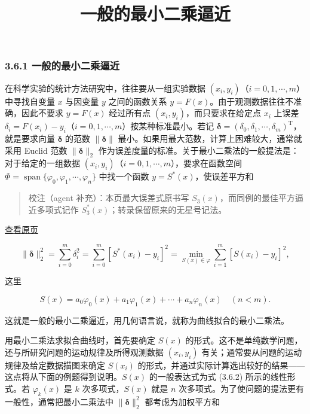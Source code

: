 \documentclass[
  10pt,
  fontset=fandol]{ctexart}
\title{一般的最小二乘逼近}
\author{}
\date{}
\begin{document}
\maketitle

\subsubsection{3.6.1 一般的最小二乘逼近}\label{ux4e00ux822cux7684ux6700ux5c0fux4e8cux4e58ux903cux8fd1}

在科学实验的统计方法研究中，往往要从一组实验数据 \((x_i,y_i)\)（\(i=0,1,\cdots,m\)）中寻找自变量 \(x\) 与因变量 \(y\) 之间的函数关系 \(y=F(x)\)。由于观测数据往往不准确，因此不要求 \(y=F(x)\) 经过所有点 \((x_i,y_i)\)，而只要求在给定点 \(x_i\) 上误差 \(\delta_i=F(x_i)-y_i\)（\(i=0,1,\cdots,m\)）按某种标准最小。若记 \(\boldsymbol\delta=(\delta_0,\delta_1,\cdots,\delta_m)^{\mathrm T}\)，就是要求向量 \(\boldsymbol\delta\) 的范数 \(\|\boldsymbol\delta\|\) 最小。如果用最大范数，计算上困难较大，通常就采用 Euclid 范数 \(\|\boldsymbol\delta\|_2\) 作为误差度量的标准。关于最小二乘法的一般提法是：对于给定的一组数据 \((x_i,y_i)\)（\(i=0,1,\cdots,m\)），要求在函数空间 \(\Phi=\operatorname{span}\{\varphi_0,\varphi_1,\cdots,\varphi_n\}\) 中找一个函数 \(y=S^*(x)\)，使误差平方和

\begin{quote}
校注（agent 补充）：本页最大误差式原书写 \(S_3(x)\)，而同例的最佳平方逼近多项式记作 \(S_3^*(x)\)；转录保留原来的无星号记法。
\end{quote}

\href{../../source-images/pdf-079.jpeg}{查看原页}

\[
\|\boldsymbol\delta\|_2^2=\sum_{i=0}^m\delta_i^2=\sum_{i=0}^m[S^*(x_i)-y_i]^2=\min_{S(x)\in\varphi}\sum_{i=1}^m[S(x_i)-y_i]^2,\tag{3.6.1}
\]

这里

\[
S(x)=a_0\varphi_0(x)+a_1\varphi_1(x)+\cdots+a_n\varphi_n(x)\quad(n<m).\tag{3.6.2}
\]

这就是一般的最小二乘逼近，用几何语言说，就称为曲线拟合的最小二乘法。

用最小二乘法求拟合曲线时，首先要确定 \(S(x)\) 的形式。这不是单纯数学问题，还与所研究问题的运动规律及所得观测数据 \((x_i,y_i)\) 有关；通常要从问题的运动规律及给定数据描图来确定 \(S(x_i)\) 的形式，并通过实际计算选出较好的结果------这点将从下面的例题得到说明。\(S(x)\) 的一般表达式为式 (3.6.2) 所示的线性形式。若 \(\varphi_k(x)\) 是 \(k\) 次多项式，\(S(x)\) 就是 \(n\) 次多项式。为了使问题的提法更有一般性，通常把最小二乘法中 \(\|\boldsymbol\delta\|_2^2\) 都考虑为加权平方和
\end{document}
